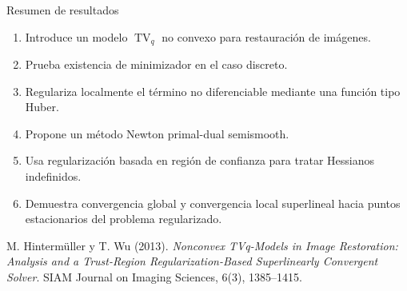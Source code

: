 \documentclass[9pt]{beamer}
\newcommand{\TV}{\operatorname{TV}}
\begin{document}
\begin{frame}{Resumen de resultados}
\begin{enumerate}
    \item Introduce un modelo \(\TV_q\) no convexo para restauración de imágenes.
    \item Prueba existencia de minimizador en el caso discreto.
    \item Regulariza localmente el término no diferenciable mediante una función tipo Huber.
    \item Propone un método Newton primal-dual semismooth.
    \item Usa regularización basada en región de confianza para tratar Hessianos indefinidos.
    \item Demuestra convergencia global y convergencia local superlineal hacia puntos estacionarios del problema regularizado.
\end{enumerate}
\vspace{1cm}
{\footnotesize
M. Hintermüller y T. Wu (2013). \emph{Nonconvex TVq-Models in Image Restoration: Analysis and a Trust-Region Regularization-Based Superlinearly Convergent Solver}. SIAM Journal on Imaging Sciences, 6(3), 1385--1415.
}
\end{frame}
\end{document}
